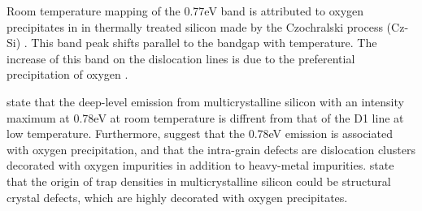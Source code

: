 Room temperature mapping of the 0.77eV band is attributed to oxygen precipitates in in thermally treated silicon made by the Czochralski process (Cz-Si) \cite{tajima95}. This band peak shifts parallel to the bandgap with temperature. The increase of this band on the dislocation lines is due to the preferential precipitation of oxygen \cite{tajima95}.

\cite{inoue07} state that the deep-level emission from multicrystalline silicon with an intensity maximum at 0.78eV at room temperature is diffrent from that of the D1 line at low temperature. Furthermore, \cite{inoue07} suggest that the 0.78eV emission is associated with oxygen precipitation, and that the intra-grain defects are dislocation clusters decorated with oxygen impurities in addition to heavy-metal impurities. \cite{gundel08} state that the origin of trap densities in multicrystalline silicon could be structural crystal defects, which are highly decorated with oxygen precipitates.

